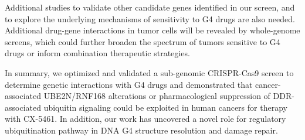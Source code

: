 Additional studies to validate other candidate genes identified in our screen, and to explore the underlying mechanisms of sensitivity to G4 drugs are also needed. Additional drug-gene interactions in tumor cells will be revealed by whole-genome screens, which could further broaden the spectrum of tumors sensitive to G4 drugs or inform combination therapeutic strategies.

In summary, we optimized and validated a sub-genomic CRISPR-Cas9 screen to determine genetic interactions with G4 drugs and demonstrated that cancer-associated UBE2N/RNF168 alterations or pharmacological suppression of DDR-associated ubiquitin signaling could be exploited in human cancers for therapy with CX-5461. In addition, our work has uncovered a novel role for regulatory ubiquitination pathway in DNA G4 structure resolution and damage repair.  




